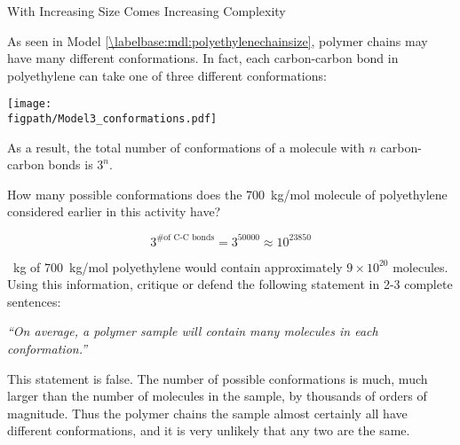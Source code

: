 \begin{activity}{With Increasing Size Comes Increasing Complexity}
\begin{ctqs}
\begin{enumerate}
		\end{enumerate}
		
\end{ctqs}



\begin{model}
	\label{\labelbase:mdl:conformations}

	As seen in Model \ref{\labelbase:mdl:polyethylenechainsize}, polymer chains may have many different conformations.  In fact, each carbon-carbon bond in polyethylene can take one of three different conformations:
	
	\vspace{6pt}
	\centerline{\texttt{[image: \\figpath/Model3\_conformations.pdf]}}
	
	As a result, the total number of conformations of a molecule with $n$ carbon-carbon bonds is $3^n$.

\end{model}

\begin{ctqs}

	\question How many possible conformations does the 700~kg/mol molecule of polyethylene considered earlier in this activity have?
	
		\begin{solution}[1in]
			\begin{equation*}
				3^{\text{\# of C-C bonds}} = 3^{50000} \approx 10^{23850}
			\end{equation*}
		\end{solution}
	
	~kg of 700~kg/mol polyethylene would contain approximately $9\times 10^{20}$ molecules.  Using this information, critique or defend the following statement in 2-3 complete sentences:
	
		\emph{``On average, a polymer sample will contain many molecules in each conformation.''}
	
		\begin{solution}[2.5in]
		
			This statement is false.  The number of possible conformations is much, much larger than the number of molecules in the sample, by thousands of orders of magnitude.  Thus the polymer chains the sample almost certainly all have different conformations, and it is very unlikely that any two are the same.
		\end{solution}
		
\end{ctqs}



\end{activity}

